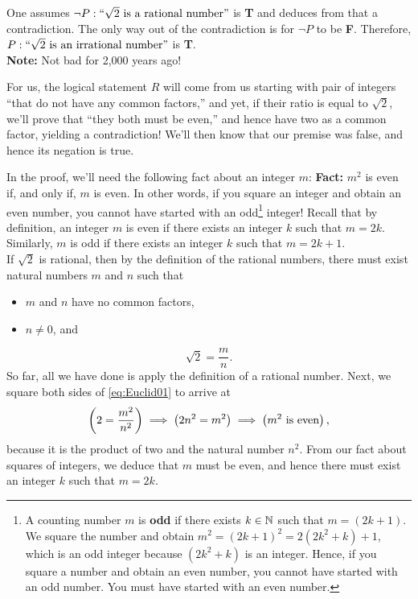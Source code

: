 \begin{tcolorbox}[title = {The Logic of Euclid's Proof by Contradiction}, sharp corners, colback=lightgold, colframe=black, coltitle=white, breakable, fonttitle=\bfseries]
One assumes $\lnot P: ``\sqrt{2} \text{ is a rational number''}$ is \textbf{T} and deduces from that a contradiction. The only way out of the contradiction is for $\lnot P$ to be \textbf{F}. Therefore, $P: ``\sqrt{2} \text{ is an irrational number''}$ is \textbf{T}.\\

\textbf{Note:} Not bad for 2,000 years ago! 
\end{tcolorbox}

For us, the logical statement $R$ will come from us starting with pair of integers ``that do not have any common factors,'' and yet, if their ratio is equal to $\sqrt{2}$, we'll prove that ``they both must be even,'' and hence have two as a common factor, yielding a contradiction! We'll then know that our premise was false, and hence its negation is true.

In the proof, we'll need the following fact about an integer $m$: \textbf{Fact:} $m^2$ is even if, and only if, $m$ is even. In other words, if you square an integer and obtain an even number, you cannot have started with an odd\footnote{A counting number $m$ is \textbf{odd} if there exists $k \in \mathbb N$ such that $m = (2k+1)$. We square the number and obtain $m^2 = (2k+1)^2 = 2(2k^2 + k) +1$, which is an odd integer because $(2k^2 + k)$ is an integer. Hence, if you square a number and obtain an even number, you cannot have started with an odd number. You must have started with an even number.} integer! Recall that by definition, an integer $m$ is even if there exists an integer $k$ such that $m = 2 k$. Similarly, $m$ is odd if there exists an integer $k$ such that $m = 2 k + 1$.\\

If $\sqrt{2}$ is rational, then by the definition of the rational numbers, there must exist natural numbers $m$ and $n$ such that 
\begin{itemize}
    \item $m$ and $n$ have no common factors, 
    \item $n \neq 0$, and 
\end{itemize}
\begin{equation}
\label{eq:Euclid01}
        \sqrt{2} = \frac{m}{n}.
\end{equation}
So far, all we have done is apply the definition of a rational number. Next, we square both sides of \eqref{eq:Euclid01} to arrive at  
$$ \left(2 = \frac{m^2}{n^2} \right) \implies \left(2n^2 = m^2 \right) \implies \left(m^2\textnormal{ is even}\right),$$ 
because it is the product of two and the natural number $n^2$. From our fact about squares of integers, we deduce that $m$ must be even, and hence there must exist an integer $k$ such that $m=2 k$.\\

